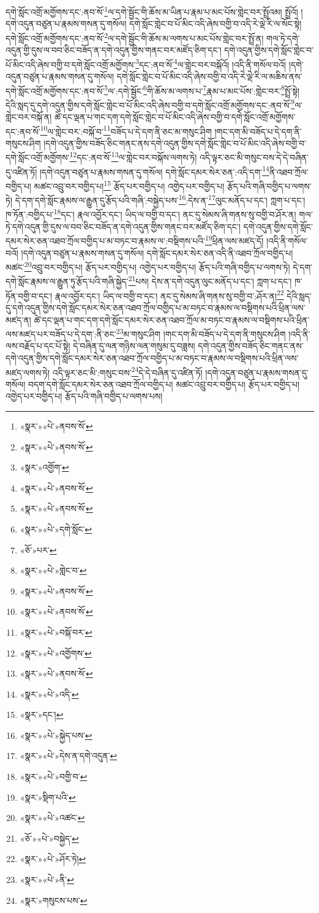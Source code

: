 དགེ་སློང་འགྲོ་མགྱོགས་དང་:ནབ་སོ་\footnote{«སྣར་»«པེ་»ནབས་སོ་}ལ་དགེ་སྦྱོང་གི་ཆོས་མ་ཡིན་པ་རྣམ་པ་མང་པོས་གླེང་བར་སྤྲོའམ། སྤྲོའོ། །དགེ་འདུན་བཙུན་པ་རྣམས་གསན་དུ་གསོལ། དགེ་སློང་གླེང་བ་པོ་མིང་འདི་ཞེས་བགྱི་བ་འདི་རེ་ལྡེ་རི་ལ་སོང་སྟེ། དགེ་སློང་འགྲོ་མགྱོགས་དང་:ནབ་སོ་\footnote{«སྣར་»«པེ་»ནབས་སོ་}ལ་དགེ་སྦྱོང་གི་ཆོས་མ་ལགས་པ་མང་པོས་གླེང་བར་སྤྲོ་ན། གལ་ཏེ་དགེ་འདུན་གྱི་དུས་ལ་བབ་ཅིང་བཟོད་ན་དགེ་འདུན་གྱིས་གནང་བར་མཛོད་ཅིག་དང་། དགེ་འདུན་གྱིས་དགེ་སློང་གླེང་བ་པོ་མིང་འདི་ཞེས་བགྱི་བ་དགེ་སློང་འགྲོ་མགྱོགས་\footnote{«སྣར་»འགྱོག་}དང་:ནབ་སོ་\footnote{«སྣར་»«པེ་»ནབས་སོ་}ལ་གླེང་བར་བསྐོའོ། །འདི་ནི་གསོལ་བའོ། །དགེ་འདུན་བཙུན་པ་རྣམས་གསན་དུ་གསོལ། དགེ་སློང་གླེང་བ་པོ་མིང་འདི་ཞེས་བགྱི་བ་འདི་རེ་ལྡེ་རི་ལ་མཆིས་ནས་དགེ་སློང་འགྲོ་མགྱོགས་དང་:ནབ་སོ་\footnote{«སྣར་»«པེ་»ནབས་སོ་}ལ་:དགེ་སྦྱོང་\footnote{«སྣར་»«པེ་»དགེ་སློང་}གི་ཆོས་མ་ལགས་པ་\footnote{«ཅོ་»པར་}རྣམ་པ་མང་པོས་:གླེང་བར་\footnote{«སྣར་»«པེ་»གླེང་བ་}སྤྲོ་སྟེ། དེའི་སླད་དུ་དགེ་འདུན་གྱིས་དགེ་སློང་གླེང་བ་པོ་མིང་འདི་ཞེས་བགྱི་བ་དགེ་སློང་འགྲོ་མགྱོགས་དང་:ནབ་སོ་\footnote{«སྣར་»«པེ་»ནབས་སོ་}ལ་གླེང་བར་བསྐོ་ན། ཚེ་དང་ལྡན་པ་གང་དག་དགེ་སློང་གླེང་བ་པོ་མིང་འདི་ཞེས་བགྱི་བ་དགེ་སློང་འགྲོ་མགྱོགས་དང་:ནབ་སོ་\footnote{«སྣར་»«པེ་»ནབས་སོ་}ལ་གླེང་བར་:བསྐོ་བ་\footnote{«སྣར་»«པེ་»བསྐོ་བར་}བཟོད་པ་དེ་དག་ནི་ཅང་མ་གསུང་ཤིག །གང་དག་མི་བཟོད་པ་དེ་དག་ནི་གསུངས་ཤིག །དགེ་འདུན་གྱིས་བཟོད་ཅིང་གནང་ནས་དགེ་འདུན་གྱིས་དགེ་སློང་གླེང་བ་པོ་མིང་འདི་ཞེས་བགྱི་བ་དགེ་སློང་འགྲོ་མགྱོགས་\footnote{«སྣར་»«པེ་»འགྱོགས་}དང་:ནབ་སོ་\footnote{«སྣར་»«པེ་»ནབས་སོ་}ལ་གླེང་བར་བསྐོས་ལགས་ཏེ། འདི་ལྟར་ཅང་མི་གསུང་བས་དེ་དེ་བཞིན་དུ་འཛིན་ཏོ། །དགེ་འདུན་བཙུན་པ་རྣམས་གསན་དུ་གསོལ། དགེ་སློང་དམར་སེར་ཅན་:འདི་དག་\footnote{«སྣར་»«པེ་»འདི་}ནི་འཐབ་ཀྲོལ་བགྱིད་པ། མཚང་འབྲུ་བར་བགྱིད་པ།\footnote{«སྣར་»དང་།} རྩོད་པར་བགྱིད་པ། འགྱེད་པར་བགྱིད་པ། རྩོད་པའི་གཞི་བགྱིད་པ་ལགས་ཏེ། དེ་དག་དགེ་སློང་རྣམས་ལ་རྒྱུན་དུ་རྩོད་པའི་གཞི་:བསྐྱེད་པས་\footnote{«སྣར་»«པེ་»སྐྱེད་པས་}:དེས་ན་\footnote{«སྣར་»«པེ་»དེས་ན་དགེ་འདུན་}ལུང་མནོད་པ་དང་། ཀླག་པ་དང་། ཁ་ཏོན་:བགྱིད་པ་\footnote{«སྣར་»«པེ་»བགྱི་བ་}དང་། རྣལ་འབྱོར་དང་། ཡིད་ལ་བགྱི་བ་དང་། ནང་དུ་སེམས་ཞི་གནས་སུ་བགྱི་བ་ཤོར་ན། གལ་ཏེ་དགེ་འདུན་གྱི་དུས་ལ་བབ་ཅིང་བཟོད་ན་དགེ་འདུན་གྱིས་གནང་བར་མཛོད་ཅིག་དང་། དགེ་འདུན་གྱིས་དགེ་སློང་དམར་སེར་ཅན་འཐབ་ཀྲོལ་བགྱིད་པ་མ་བཏང་བ་རྣམས་ལ་:བསྡིགས་པའི་\footnote{«སྣར་»སྡིག་པའི་}ཕྲིན་ལས་མཛད་དོ། །འདི་ནི་གསོལ་བའོ། །དགེ་འདུན་བཙུན་པ་རྣམས་གསན་དུ་གསོལ། དགེ་སློང་དམར་སེར་ཅན་འདི་ནི་འཐབ་ཀྲོལ་བགྱིད་པ། མཚང་\footnote{«སྣར་»«པེ་»འཚང་}འབྲུ་བར་བགྱིད་པ། རྩོད་པར་བགྱིད་པ། འགྱེད་པར་བགྱིད་པ། རྩོད་པའི་གཞི་བགྱིད་པ་ལགས་ཏེ། དེ་དག་དགེ་སློང་རྣམས་ལ་རྒྱུན་ཏུ་རྩོད་པའི་གཞི་སྐྱེད་\footnote{«ཅོ་»«པེ་»བསྐྱེད་}པས། དེས་ན་དགེ་འདུན་ལུང་མནོད་པ་དང་། ཀླག་པ་དང་། ཁ་ཏོན་བགྱི་བ་དང་། རྣལ་འབྱོར་དང་། ཡིད་ལ་བགྱི་བ་དང་། ནང་དུ་སེམས་ཞི་གནས་སུ་བགྱི་བ་:ཤོར་ན།\footnote{«སྣར་»«པེ་»ཤོར་ཏེ།} དེའི་སླད་དུ་དགེ་འདུན་གྱིས་དགེ་སློང་དམར་སེར་ཅན་འཐབ་ཀྲོལ་བགྱིད་པ་མ་བཏང་བ་རྣམས་ལ་བསྡིགས་པའི་ཕྲིན་ལས་མཛད་ན། ཚེ་དང་ལྡན་པ་གང་དག་དགེ་སློང་དམར་སེར་ཅན་འཐབ་ཀྲོལ་མ་བཏང་བ་རྣམས་ལ་བསྡིགས་པའི་ཕྲིན་ལས་མཛད་པར་བཟོད་པ་དེ་དག་:ནི་ཅང་\footnote{«སྣར་»«པེ་»ནི་}མ་གསུང་ཤིག །གང་དག་མི་བཟོད་པ་དེ་དག་ནི་གསུངས་ཤིག །འདི་ནི་ལས་བརྗོད་པ་དང་པོ་སྟེ། དེ་བཞིན་དུ་ལན་གཉིས་ལན་གསུམ་དུ་བཟླས། དགེ་འདུན་གྱིས་བཟོད་ཅིང་གནང་ནས་དགེ་འདུན་གྱིས་དགེ་སློང་དམར་སེར་ཅན་འཐབ་ཀྲོལ་བགྱིད་པ་མ་བཏང་བ་རྣམས་ལ་བསྡིགས་པའི་ཕྲིན་ལས་མཛད་ལགས་ཏེ། འདི་ལྟར་ཅང་མི་:གསུང་བས་\footnote{«སྣར་»གསུངས་པས་}དེ་དེ་བཞིན་དུ་འཛིན་ཏོ། །དགེ་འདུན་བཙུན་པ་རྣམས་གསན་དུ་གསོལ། བདག་དགེ་སློང་དམར་སེར་ཅན་འཐབ་ཀྲོལ་བགྱིད་པ། མཚང་འབྲུ་བར་བགྱིད་པ། རྩོད་པར་བགྱིད་པ། འགྱེད་པར་བགྱིད་པ། རྩོད་པའི་གཞི་བགྱིད་པ་ལགས་པས། 